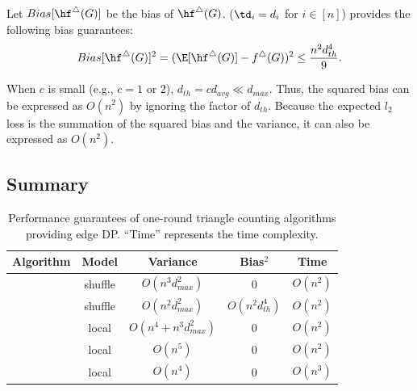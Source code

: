 \begin{theorem}
\label{chap3-thm:bias_II_ast}
Let $Bias[\hf^\triangle(G)]$ be the bias of $\hf^\triangle(G)$. 
\AlgWSTriVR{} ($\td_i = d_i$ for $i\in[n]$) 
provides the following bias guarantees:
\begin{align}
    Bias[\hf^\triangle(G)]^2 
    = (\E[\hf^\triangle(G)] - f^\triangle(G))^2 
    \leq \frac{n^2 d_{th}^4}{9}. 
    \label{chap3-eq:thm:bias_II_ast}
\end{align}
\end{theorem}

When $c$ is small (e.g., $c=1$ or $2$), $d_{th} = c d_{avg} \ll d_{max}$. 
Thus, the squared bias can be expressed as $O(n^2)$ by ignoring the factor of $d_{th}$. 
Because the expected $l_2$ loss is the summation of the squared bias and the variance, it can also be expressed as $O(n^2)$. 

\subsection{Summary}
\label{chap3-sub:summary}


\begin{table}[t]
  \centering
  \begin{tabular}{|l|c|c|c|c|}
    \hline
    Algorithm & Model & Variance & Bias$^2$ & Time \\ \hline
    \AlgWSTri{} & shuffle & $O(n^3 d_{max}^2)$ & $0$ & $O(n^2)$ \\ \hline
    \AlgWSTriVR{}{} & shuffle & $O(n^2 d_{max}^2)$ & $O(n^2 d_{th}^4)$ & $O(n^2)$ \\ \hline
    \AlgWLTri{} \cite{Imola_USENIX22} & local & $O(n^4 + n^3 d_{max}^2)$ & $0$ & $O(n^2)$ \\ \hline
    \AlgARRTri{} \cite{Imola_USENIX22} & local & $O(n^5)$ & $0$ & $O(n^2)$ \\ \hline
    \AlgRRTri{} \cite{Imola_USENIX21} & local & $O(n^4)$ & $0$ & $O(n^3)$ \\ \hline
  \end{tabular}
  \caption{Performance guarantees of one-round triangle counting algorithms providing edge DP. 
  ``Time'' represents the time complexity. 
  }
  \label{chap3-tab:upper_bounds}
\end{table}

